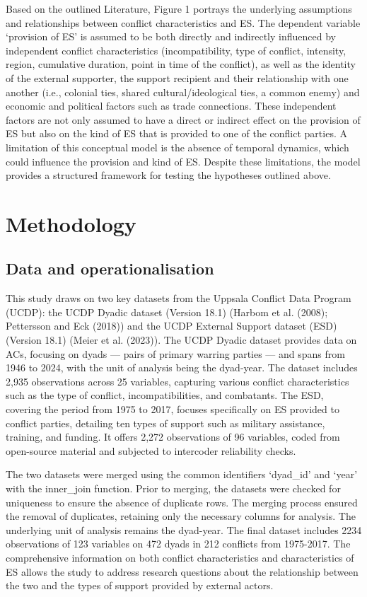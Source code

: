 \documentclass[
]{article}
\begin{document}
Based on the outlined Literature, Figure 1 portrays the underlying
assumptions and relationships between conflict characteristics and ES.
The dependent variable `provision of ES' is assumed to be both directly
and indirectly influenced by independent conflict characteristics
(incompatibility, type of conflict, intensity, region, cumulative
duration, point in time of the conflict), as well as the identity of the
external supporter, the support recipient and their relationship with
one another (i.e., colonial ties, shared cultural/ideological ties, a
common enemy) and economic and political factors such as trade
connections. These independent factors are not only assumed to have a
direct or indirect effect on the provision of ES but also on the kind of
ES that is provided to one of the conflict parties. A limitation of this
conceptual model is the absence of temporal dynamics, which could
influence the provision and kind of ES. Despite these limitations, the
model provides a structured framework for testing the hypotheses
outlined above.

\section{Methodology}\label{methodology}

\subsection{Data and
operationalisation}\label{data-and-operationalisation}

This study draws on two key datasets from the Uppsala Conflict Data
Program (UCDP): the UCDP Dyadic dataset (Version 18.1) (Harbom et al.
(2008); Pettersson and Eck (2018)) and the UCDP External Support dataset
(ESD) (Version 18.1) (Meier et al. (2023)). The UCDP Dyadic dataset
provides data on ACs, focusing on dyads --- pairs of primary warring
parties --- and spans from 1946 to 2024, with the unit of analysis being
the dyad-year. The dataset includes 2,935 observations across 25
variables, capturing various conflict characteristics such as the type
of conflict, incompatibilities, and combatants. The ESD, covering the
period from 1975 to 2017, focuses specifically on ES provided to
conflict parties, detailing ten types of support such as military
assistance, training, and funding. It offers 2,272 observations of 96
variables, coded from open-source material and subjected to intercoder
reliability checks.

The two datasets were merged using the common identifiers `dyad\_id' and
`year' with the inner\_join function. Prior to merging, the datasets
were checked for uniqueness to ensure the absence of duplicate rows. The
merging process ensured the removal of duplicates, retaining only the
necessary columns for analysis. The underlying unit of analysis remains
the dyad-year. The final dataset includes 2234 observations of 123
variables on 472 dyads in 212 conflicts from 1975-2017. The
comprehensive information on both conflict characteristics and
characteristics of ES allows the study to address research questions
about the relationship between the two and the types of support provided
by external actors.
\end{document}
